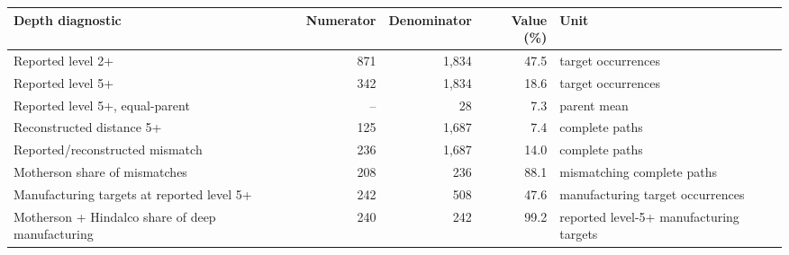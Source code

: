 \begin{tabular}{lrrrl}
\toprule
Depth diagnostic & Numerator & Denominator & Value (\%) & Unit \\
\midrule
Reported level 2+ & 871 & 1,834 & 47.5 & target occurrences \\
Reported level 5+ & 342 & 1,834 & 18.6 & target occurrences \\
Reported level 5+, equal-parent & -- & 28 & 7.3 & parent mean \\
Reconstructed distance 5+ & 125 & 1,687 & 7.4 & complete paths \\
Reported/reconstructed mismatch & 236 & 1,687 & 14.0 & complete paths \\
Motherson share of mismatches & 208 & 236 & 88.1 & mismatching complete paths \\
Manufacturing targets at reported level 5+ & 242 & 508 & 47.6 & manufacturing target occurrences \\
Motherson + Hindalco share of deep manufacturing & 240 & 242 & 99.2 & reported level-5+ manufacturing targets \\
\bottomrule
\end{tabular}
